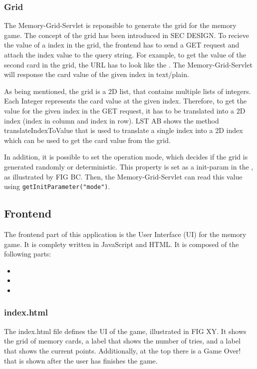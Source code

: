 \subsubsection{Grid}\label{subsubsec:03_impl_backend_grid}
The Memory-Grid-Servlet is reponsible to generate the grid for the memory game. The concept of the grid has been introduced in SEC DESIGN.
To recieve the value of a index in the grid, the frontend has to send a GET request and attach the index value to the query string. For example, to get the value of the second card in the grid, the URL has to look like the .
The Memory-Grid-Servlet will response the card value of the given index in text/plain.

As being mentioned, the grid is a 2D list, that contains multiple lists of integers. Each Integer represents the card value at the given index. Therefore, to get the value for the given index in the GET request, it has to be translated into a 2D index (index in column and index in row). LST AB shows the method translateIndexToValue that is used to translate a single index into a 2D index which can be used to get the card value from the grid.

In addition, it is possible to set the operation mode, which decides if the grid is generated randomly or deterministic. This property is set as a init-param in the , as illustrated by FIG BC. Then, the Memory-Grid-Servlet can read this value using \texttt{getInitParameter("mode")}.


\subsection{Frontend}\label{subsec:03_impl_frontend}
The frontend part of this application is the User Interface (UI) for the memory game. It is complety written in JavaScript and HTML.
%
It is composed of the following parts:
\begin{itemize}
\item {}
\item {}
\item {}
\end{itemize}

\subsubsection{index.html}
The index.html file defines the UI of the game, illustrated in FIG XY. It shows the grid of memory cards, a label that shows the number of tries, and a label that shows the current points. Additionally, at the top there is a Game Over! that is shown after the user has finishes the game.

